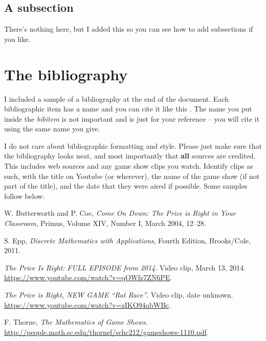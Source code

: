 \documentclass[12pt, leqno]{article}
\begin{document}
\subsection{A subsection}
There's nothing here, but I added this so you can see how to add subsections if you like.

\section{The bibliography}
I included a sample of a bibliography at the end of the document. Each bibliographic item has a name and you can cite it like this
\cite{thorne}. The name you put inside the {\itshape bibitem} is not important and is just for your reference -- you will cite it using the same name you give.

I do not care about bibliographic formatting and style. Please just make sure that the bibliography looks neat, and most importantly
that {\bf all} sources are credited. This includes web sources and any game show clips you watch. 
Identify clips as such, with the title on Youtube
(or wherever), the name of the game show (if not part of the title), and the
date that they were aired if possible. Some samples follow below.


\begin{thebibliography}{10000}

 W. Butterworth and P. Coe,
{\itshape Come On Down: The Price is Right in Your Classroom},
Primus, Volume XIV, Number I, March 2004, 12--28.

 S. Epp,
{\itshape Discrete Mathematics with Applications}, Fourth Edition, Brooks/Cole, 2011.

 {\itshape The Price Is Right: FULL EPISODE from 2014}. Video clip, March 13, 2014.
\url{https://www.youtube.com/watch?v=qOWfz7ZN6PE}.

 {\itshape The Price is Right, NEW GAME ``Rat Race''}. Video clip, date unknown.
\url{https://www.youtube.com/watch?v=zIKO94qbWBc}.
 
 F. Thorne,
{\itshape The Mathematics of Game Shows}. \url{http://people.math.sc.edu/thornef/schc212/gameshows-1110.pdf}.

\end{thebibliography}
\end{document}
